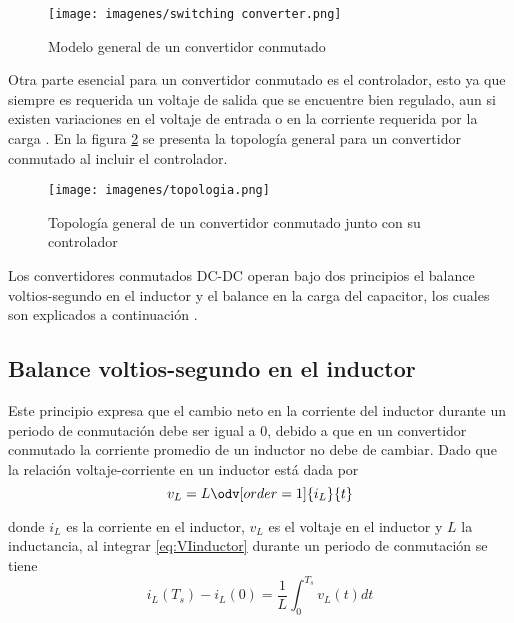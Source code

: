 \begin{figure}[H]
   \centering
   \texttt{[image: imagenes/switching converter.png]}
   \caption{Modelo general de un convertidor conmutado \cite{erickson_fundamentals_2020}}
   \label{fig:switching}
\end{figure}

Otra parte esencial para un convertidor conmutado es el controlador,  esto ya que siempre es requerida
un voltaje de salida que se encuentre bien regulado, aun si existen variaciones en el voltaje de entrada
o en la corriente requerida por la carga \cite{erickson_fundamentals_2020}. En la figura \ref{fig:controlador} se 
presenta la topología general para un convertidor conmutado al incluir el controlador. 

\begin{figure}[H]
    \centering
    \texttt{[image: imagenes/topologia.png]}
    \caption{Topología general de un convertidor conmutado junto con su controlador \cite{erickson_fundamentals_2020}}
    \label{fig:controlador}
\end{figure}

Los convertidores conmutados DC-DC operan bajo dos principios el balance voltios-segundo en el inductor y el balance en la carga del capacitor, los cuales son explicados a continuación \cite{erickson_fundamentals_2020}.


\subsection{Balance voltios-segundo en el inductor}

 Este principio expresa que el cambio neto en la corriente del inductor
durante un periodo de conmutación debe ser igual a 0, debido a que en un convertidor conmutado
la corriente promedio de un inductor no debe de cambiar. Dado que la relación voltaje-corriente en un  inductor está dada por
\begin{equation}
    v_L = L \odv[order=1]{i_L}{t}
    \label{eq:VIinductor}
\end{equation}

donde $i_L$ es la corriente en el inductor, $v_L$ es el voltaje en el inductor
y $L$ la inductancia, al integrar \ref{eq:VIinductor} durante un periodo de conmutación
se tiene 
\begin{equation}
i_L\left(T_s\right)-i_L(0)=\frac{1}{L} \int_0^{T_s} v_L(t) d t
\label{eq:integralInductor}
\end{equation}

